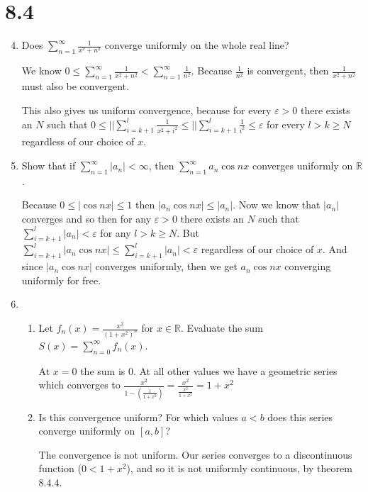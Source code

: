 \documentclass[letterpaper]{article}
\begin{document}
\renewcommand{\labelenumi}{\Alph{enumi}.}
\renewcommand{\labelenumii}{(\alph{enumii})}
\section*{8.4}
\begin{enumerate}
\setcounter{enumi}{3}
\item
Does $\sum\limits_{n=1}^\infty{\frac{1}{x^2+n^2}}$ converge uniformly on the whole real line?

We know $0\le\sum\limits_{n=1}^\infty{\frac{1}{x^2+n^2}} <\sum\limits_{n=1}^\infty{\frac{1}{n^2}}$.
Because $\frac{1}{n^2}$ is convergent, then $\frac{1}{x^2+n^2}$ must also be convergent.

This also gives us uniform convergence, because  for every $\varepsilon>0$ there exists an $N$ such that $0\le||\sum\limits_{i=k+1}^l{\frac{1}{x^2+i^2}}\le ||\sum\limits_{i=k+1}^l{\frac{1}{i^2}}\le \varepsilon$ for every $l>k\ge N$ regardless of our choice of $x$.
\item
Show that if $\sum\limits_{n=1}^\infty{\lvert a_n\rvert}<\infty$, then $\sum\limits_{n=1}^\infty{a_n\cos nx}$ converges uniformly on $\mathbb{R}$.

Because $0\le |\cos nx|\le 1$ then $|a_n\cos nx|\le |a_n|$. Now we know that $|a_n|$ converges and so then for any $\varepsilon>0$ there exists an $N$ such that $\sum\limits_{i=k+1}^l{|a_n|}<\varepsilon$ for any $l>k\ge N$. But $\sum\limits_{i=k+1}^l{|a_n\cos nx|}\le\sum\limits_{i=k+1}^l{|a_n|}<\varepsilon$ regardless of our choice of $x$. And since $|a_n\cos nx|$ converges uniformly, then we get $a_n\cos nx$ converging uniformly for free.
\item
  \begin{enumerate}
  \item
  Let $f_n(x)=\frac{x^2}{(1+x^2)^n}$ for $x\in \mathbb{R}$. Evaluate the sum $S(x)=\sum\limits_{n=0}^\infty{f_n(x)}$.

  At $x=0$ the sum is $0$. At all other values we have a geometric series which converges to $\frac{x^2}{1-(\frac{1}{1+x^2})}=\frac{x^2}{\frac{x^2}{1+x^2}}=1+x^2$
  \item
  Is this convergence uniform? For which values $a<b$ does this series converge uniformly on $[a,b]$?

  The convergence is not uniform. Our series converges to a discontinuous function ($0<1+x^2$), and so it is not uniformly continuous, by theorem 8.4.4.


\end{enumerate}
\end{enumerate}
\end{document}
